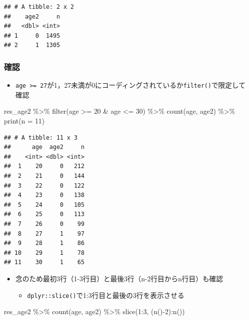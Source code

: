 \documentclass[
  xelatex,ja=standard, b5paper]{bxjsbook}
\newenvironment{Shaded}{\begin{snugshade}}{\end{snugshade}}
\newcommand{\AttributeTok}[1]{\textcolor[rgb]{0.77,0.63,0.00}{#1}}
\newcommand{\DecValTok}[1]{\textcolor[rgb]{0.00,0.00,0.81}{#1}}
\newcommand{\FunctionTok}[1]{\textcolor[rgb]{0.00,0.00,0.00}{#1}}
\newcommand{\NormalTok}[1]{#1}
\newcommand{\SpecialCharTok}[1]{\textcolor[rgb]{0.00,0.00,0.00}{#1}}
\providecommand{\tightlist}{%
  \setlength{\itemsep}{0pt}\setlength{\parskip}{0pt}}
\begin{document}
\begin{verbatim}
## # A tibble: 2 x 2
##    age2     n
##   <dbl> <int>
## 1     0  1495
## 2     1  1305
\end{verbatim}

\hypertarget{ux78baux8a8d-1}{%
\subsubsection{確認}\label{ux78baux8a8d-1}}

\begin{itemize}
\tightlist
\item
  \texttt{age\ \textgreater{}=\ 27}が1，27未満が0にコーディングされているか\texttt{filter()}で限定して確認
\end{itemize}

\begin{Shaded}
\begin{Highlighting}[]
\NormalTok{res\_age2 }\SpecialCharTok{\%\textgreater{}\%} 
  \FunctionTok{filter}\NormalTok{(age }\SpecialCharTok{\textgreater{}=} \DecValTok{20} \SpecialCharTok{\&}\NormalTok{ age }\SpecialCharTok{\textless{}=} \DecValTok{30}\NormalTok{) }\SpecialCharTok{\%\textgreater{}\%} 
  \FunctionTok{count}\NormalTok{(age, age2) }\SpecialCharTok{\%\textgreater{}\%} 
  \FunctionTok{print}\NormalTok{(}\AttributeTok{n =} \DecValTok{11}\NormalTok{)}
\end{Highlighting}
\end{Shaded}

\begin{verbatim}
## # A tibble: 11 x 3
##      age  age2     n
##    <int> <dbl> <int>
##  1    20     0   212
##  2    21     0   144
##  3    22     0   122
##  4    23     0   138
##  5    24     0   105
##  6    25     0   113
##  7    26     0    99
##  8    27     1    97
##  9    28     1    86
## 10    29     1    78
## 11    30     1    65
\end{verbatim}

\begin{itemize}
\tightlist
\item
  念のため最初3行（1-3行目）と最後3行（n-2行目からn行目）も確認

  \begin{itemize}
  \tightlist
  \item
    \texttt{dplyr::slice()}で1:3行目と最後の3行を表示させる
  \end{itemize}
\end{itemize}

\begin{Shaded}
\begin{Highlighting}[]
\NormalTok{res\_age2 }\SpecialCharTok{\%\textgreater{}\%} 
  \FunctionTok{count}\NormalTok{(age, age2) }\SpecialCharTok{\%\textgreater{}\%} 
  \FunctionTok{slice}\NormalTok{(}\DecValTok{1}\SpecialCharTok{:}\DecValTok{3}\NormalTok{, (}\FunctionTok{n}\NormalTok{()}\SpecialCharTok{{-}}\DecValTok{2}\NormalTok{)}\SpecialCharTok{:}\FunctionTok{n}\NormalTok{())}
\end{Highlighting}
\end{Shaded}
\end{document}
